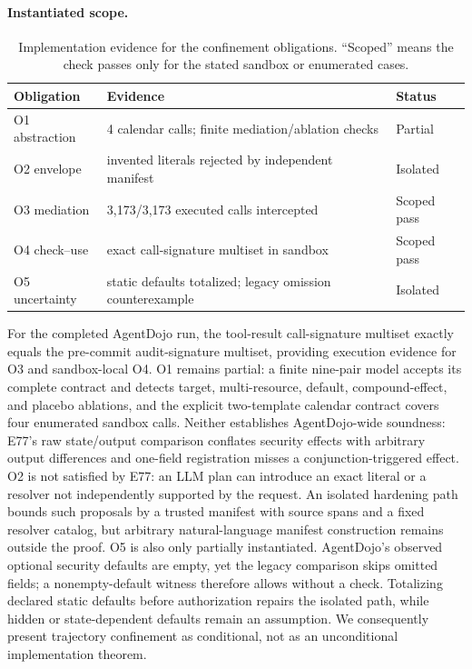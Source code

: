 \documentclass[letterpaper,twocolumn,10pt]{article}
\begin{document}
\paragraph{Instantiated scope.}
\begin{table}[t]
\centering
\small
\caption{Implementation evidence for the confinement obligations. ``Scoped'' means the check passes only for the stated sandbox or enumerated cases.}
\label{tab:e80-obligations}
\begin{tabular}{@{}p{}p{}p{}@{}}
\toprule
Obligation & Evidence & Status \\
\midrule
O1 abstraction & 4 calendar calls; finite mediation/ablation checks & Partial \\
O2 envelope & invented literals rejected by independent manifest & Isolated \\
O3 mediation & 3,173/3,173 executed calls intercepted & Scoped pass \\
O4 check--use & exact call-signature multiset in sandbox & Scoped pass \\
O5 uncertainty & static defaults totalized; legacy omission counterexample & Isolated \\
\bottomrule
\end{tabular}
\end{table}
 For the completed AgentDojo run, the tool-result call-signature multiset exactly equals the pre-commit audit-signature multiset, providing execution evidence for O3 and sandbox-local O4. O1 remains partial: a finite nine-pair model accepts its complete contract and detects target, multi-resource, default, compound-effect, and placebo ablations, and the explicit two-template calendar contract covers four enumerated sandbox calls. Neither establishes AgentDojo-wide soundness: E77's raw state/output comparison conflates security effects with arbitrary output differences and one-field registration misses a conjunction-triggered effect. O2 is not satisfied by E77: an LLM plan can introduce an exact literal or a resolver not independently supported by the request. An isolated hardening path bounds such proposals by a trusted manifest with source spans and a fixed resolver catalog, but arbitrary natural-language manifest construction remains outside the proof. O5 is also only partially instantiated. AgentDojo's observed optional security defaults are empty, yet the legacy comparison skips omitted fields; a nonempty-default witness therefore allows without a check. Totalizing declared static defaults before authorization repairs the isolated path, while hidden or state-dependent defaults remain an assumption. We consequently present trajectory confinement as conditional, not as an unconditional implementation theorem.
\end{document}
